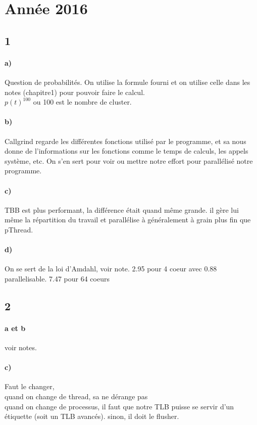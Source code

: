 \documentclass[oneside]{book}
\begin{document}
\section{Année 2016}
\subsection{1}
\paragraph{a)}
Question de probabilités. On utilise la formule fourni et on utilise celle dans les notes (chapitre1) pour pouvoir faire le calcul. \\
$p(t)^{100}$ ou 100 est le nombre de cluster.
\paragraph{b)}
Callgrind regarde les différentes fonctions utilisé par le programme, et sa nous donne de l'informations sur les fonctions comme le temps de calculs, les appels système, etc. On s'en sert pour voir ou mettre notre effort pour parallélisé notre programme.
\paragraph{c)}
TBB est plus performant, la différence était quand même grande. il gère lui même la répartition du travail et parallélise à généralement à grain plus fin que pThread.
\paragraph{d)}
On se sert de la loi d'Amdahl, voir note.
2.95 pour 4 coeur avec 0.88 parallelisable. 7.47 pour 64 coeurs
\subsection{2}
\paragraph{a et b}
voir notes.
\paragraph{c)}
Faut le changer,\\
quand on change de thread, sa ne dérange pas\\
quand on change de processus, il faut que notre TLB puisse se servir d'un étiquette (soit un TLB avancés). sinon, il doit le flusher.
\end{document}
